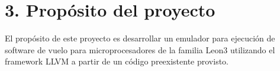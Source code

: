 \section{3. Propósito del proyecto}
\label{sec:proposito}

El propósito de este proyecto es desarrollar un emulador para ejecución de software de vuelo para microprocesadores de la familia Leon3 utilizando el framework LLVM a partir de un código preexistente provisto.
